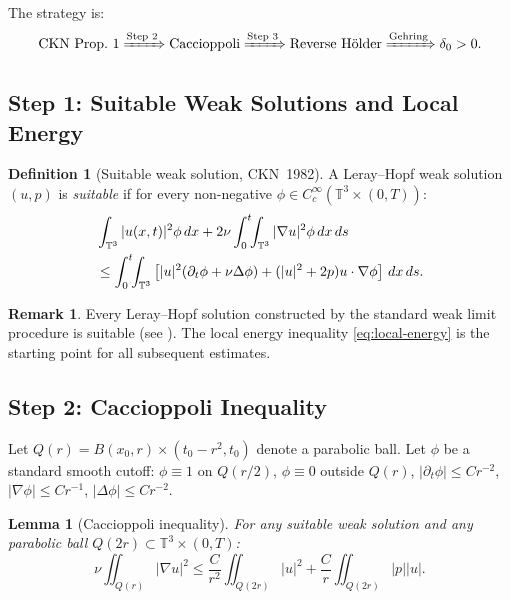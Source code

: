 \documentclass[11pt]{article}
\newtheorem{lemma}[theorem]{Lemma}
\theoremstyle{definition}
\newtheorem{definition}[theorem]{Definition}
\newtheorem{remark}[theorem]{Remark}
\theoremstyle{remark}
\newcommand{\T}{\mathbb{T}}
\newcommand{\prt}{\partial_t}
\newcommand{\grad}{\nabla}
\newcommand{\dx}{\,dx}
\newcommand{\ds}{\,ds}
\begin{document}
The strategy is:
\[
  \text{CKN Prop.~1} \xRightarrow{\text{Step 2}} \text{Caccioppoli}
  \xRightarrow{\text{Step 3}} \text{Reverse H\"older}
  \xRightarrow{\text{Gehring}} \delta_0 > 0.
\]

\subsection{Step 1: Suitable Weak Solutions and Local Energy}
\label{sec:step1}

\begin{definition}[Suitable weak solution, CKN~1982]\label{def:suitable}
  A Leray--Hopf weak solution $(u,p)$ is \emph{suitable} if for every
  non-negative $\phi\in C_c^\infty(\T^3\times(0,T))$:
  \begin{align}\label{eq:local-energy}
    &\int_{\T^3}|u(x,t)|^2\phi\dx + 2\nu\int_0^t\!\!\int_{\T^3}|\grad u|^2\phi\dx\ds \notag\\
    &\leq \int_0^t\!\!\int_{\T^3}\left[|u|^2(\prt\phi+\nu\Delta\phi)
      + (|u|^2+2p)u\cdot\grad\phi\right]\dx\ds.
  \end{align}
\end{definition}

\begin{remark}
  Every Leray--Hopf solution constructed by the standard weak limit procedure
  is suitable (see \cite{CKN1982,Lin1998}).  The local energy inequality
  \eqref{eq:local-energy} is the starting point for all subsequent estimates.
\end{remark}

\subsection{Step 2: Caccioppoli Inequality}
\label{sec:step2}

Let $Q(r) = B(x_0,r)\times(t_0-r^2,t_0)$ denote a parabolic ball.
Let $\phi$ be a standard smooth cutoff: $\phi\equiv 1$ on $Q(r/2)$,
$\phi\equiv 0$ outside $Q(r)$, $|\prt\phi|\leq Cr^{-2}$,
$|\grad\phi|\leq Cr^{-1}$, $|\Delta\phi|\leq Cr^{-2}$.

\begin{lemma}[Caccioppoli inequality]\label{lem:Caccioppoli}
  For any suitable weak solution and any parabolic ball $Q(2r)\subset\T^3\times(0,T)$:
  \begin{equation}\label{eq:Caccioppoli}
    \nu\iint_{Q(r)}|\grad u|^2
    \leq \frac{C}{r^2}\iint_{Q(2r)}|u|^2
      + \frac{C}{r}\iint_{Q(2r)}|p||u|.
  \end{equation}
\end{lemma}
\end{document}
